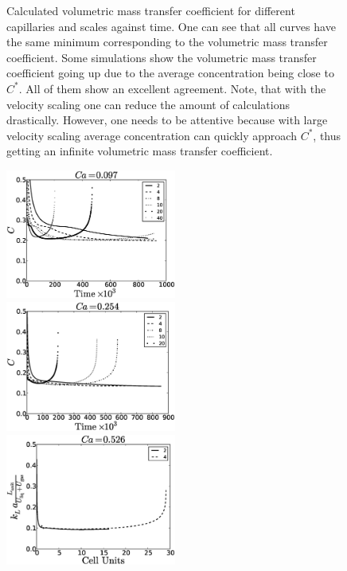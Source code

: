 \documentclass{article}
\newcommand{\cstar}{C^{*}}
\begin{document}
\begin{figure}[htb!]
\caption{Calculated volumetric mass transfer coefficient for different capillaries and scales
against time. One can see
that all curves have the same minimum corresponding to the volumetric mass transfer coefficient.
Some simulations show the volumetric mass transfer coefficient going up due to the average
concentration being close to $\cstar$. All of them show an excellent agreement. Note, that with the
velocity scaling one can reduce the amount of calculations drastically. However, one needs to be attentive
because with large velocity scaling average concentration can quickly approach $\cstar$, thus
getting an infinite volumetric mass transfer coefficient.
\label{fig:aver:conc:different:capillaries:time}}
\end{figure}
\begin{figure}[htb!]
\includegraphics[width=0.5\textwidth]{Figures/aver_conc_scale_ca097.eps}
\includegraphics[width=0.5\textwidth]{Figures/aver_conc_scale_ca054.eps}\\
\includegraphics[width=0.5\textwidth]{Figures/aver_conc_scale_ca026.eps}

\end{figure}
\end{document}
